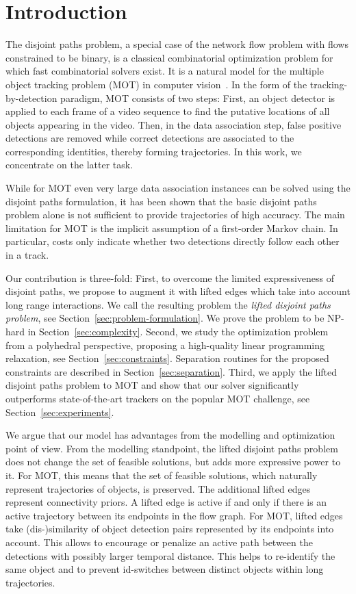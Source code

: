 \documentclass{article}
\begin{document}
 \section{Introduction}
The disjoint paths problem, a special case of the network flow problem with flows constrained to be binary, is a classical combinatorial optimization problem for which fast combinatorial solvers exist.
It is a natural model for the multiple object tracking problem (MOT) in computer vision~\cite{zhang2008global}.
In the form of the tracking-by-detection paradigm, MOT consists of two steps: First, an object detector is applied to each frame of a video sequence to find the putative locations of all objects appearing in the video.
Then, in the data association step, false positive detections are removed while correct detections are associated to the corresponding identities, thereby forming trajectories.
In this work, we concentrate on the latter task.


While for MOT even very large data association instances can be solved using the disjoint paths formulation, it has been shown that the basic disjoint paths problem alone is not sufficient to provide trajectories of high accuracy.
The main limitation for MOT is the implicit assumption of a first-order Markov chain.
In particular, costs only indicate whether two detections directly follow each other in a track.


Our contribution is three-fold:
First, to overcome the limited expressiveness of disjoint paths, we propose to augment it with lifted edges which take into account long range interactions. 
We call the resulting problem the \emph{lifted disjoint paths problem}, see Section~\ref{sec:problem-formulation}.
We prove the problem to be NP-hard in Section~\ref{sec:complexity}.
Second, we study the optimization problem from a polyhedral perspective, proposing a high-quality linear programming relaxation, see Section~\ref{sec:constraints}.
Separation routines for the proposed constraints are described in Section~\ref{sec:separation}.
Third, we apply the lifted disjoint paths problem to MOT and show that our solver significantly outperforms state-of-the-art trackers on the popular MOT challenge, see Section~\ref{sec:experiments}.



We argue that our model has advantages from the modelling and optimization point of view.
From the modelling standpoint, the lifted disjoint paths problem does not change the set of feasible solutions, but adds more expressive power to it. 
For MOT, this means that the set of feasible solutions, which naturally represent trajectories of objects, is preserved. 
The additional lifted edges represent connectivity priors.
A lifted edge is active if and only if there is an active trajectory between its endpoints in the flow graph. 
For MOT, lifted edges take (dis-)similarity of object detection pairs represented by its endpoints into account. This allows to encourage or penalize an active path between the detections with possibly larger temporal distance. This helps to re-identify the same object and to prevent id-switches between distinct objects within long trajectories.
\end{document}
